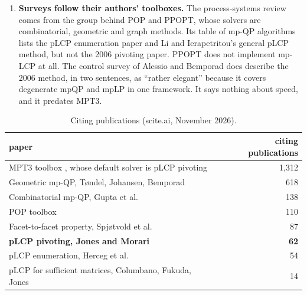 \documentclass[11pt]{article}
\begin{document}
\begin{enumerate}
  19 cite the pLCP enumeration paper \cite{herceg2015} and 10 cite the 2006 pivoting paper. Thirteen cite only the
  enumeration paper, among them M\"onnigmann \cite{monnigmann2019}, Mitze and M\"onnigmann
  \cite{mitze2020,mitze2022}, Mitze et al.\ \cite{mitze2023} and both reviews by Pappas et al. In RPOPT, that
  enumeration method is 7x to over 60,000x slower than pivoting. Survey taxonomies also split methods into
  ``geometric'' and ``enumerative''. The MPR paper files pLCP pivoting under geometric methods, as ``a numerically
  more robust extended version'' of facet stepping, and then notes that geometric methods become ``slower and less
  reliable'' as the parameter dimension grows. The method's actual mechanism, adjacency by pivoting without any
  geometric stepping, has no category of its own.
  \item \textbf{Surveys follow their authors' toolboxes.} The process-systems review \cite{pappas2021} comes from
  the group behind POP and PPOPT, whose solvers are combinatorial, geometric and graph methods. Its table of mp-QP
  algorithms lists the pLCP enumeration paper and Li and Ierapetritou's general pLCP method, but not the 2006
  pivoting paper. PPOPT does not implement mp-LCP at all. The control survey of Alessio and Bemporad
  \cite{alessio2009} does describe the 2006 method, in two sentences, as ``rather elegant'' because it covers
  degenerate mpQP and mpLP in one framework. It says nothing about speed, and it predates MPT3.
\end{enumerate}

\begin{table}[H]
\centering\small
\caption{Citing publications (scite.ai, November 2026).}
\label{tab:cites}
\begin{tabular}{@{}lr@{}}
\toprule
paper & citing publications \\
\midrule
MPT3 toolbox \cite{mpt3}, whose default solver is pLCP pivoting & 1,312 \\
Geometric mp-QP, T{\o}ndel, Johansen, Bemporad \cite{tondel2003} & 618 \\
Combinatorial mp-QP, Gupta et al.\ \cite{gupta2011} & 138 \\
POP toolbox \cite{pop2016} & 110 \\
Facet-to-facet property, Spj{\o}tvold et al.\ \cite{spjotvold2006} & 87 \\
\textbf{pLCP pivoting, Jones and Morari \cite{jm2006}} & \textbf{62} \\
pLCP enumeration, Herceg et al.\ \cite{herceg2015} & 54 \\
pLCP for sufficient matrices, Columbano, Fukuda, Jones \cite{columbano2009} & 14 \\
\bottomrule
\end{tabular}
\end{table}
\end{document}

